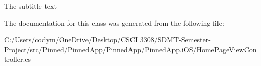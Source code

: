 The subtitle text 



The documentation for this class was generated from the following file\+:\begin{DoxyCompactItemize}
\item 
C\+:/\+Users/codym/\+One\+Drive/\+Desktop/\+C\+S\+C\+I 3308/\+S\+D\+M\+T-\/\+Semester-\/\+Project/src/\+Pinned/\+Pinned\+App/\+Pinned\+App/\+Pinned\+App.\+i\+O\+S/Home\+Page\+View\+Controller.\+cs\end{DoxyCompactItemize}
